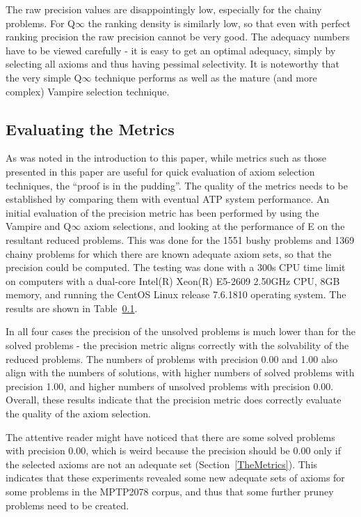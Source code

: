 \documentclass[EPiC]{easychair}
\begin{document}
The raw precision values are disappointingly low, especially for the
chainy problems.
For Q$\infty$ the ranking density is similarly low, so that even with perfect
ranking precision the raw precision cannot be very good.
The adequacy numbers have to be viewed carefully - it is easy to get an
optimal adequacy, simply by selecting all axioms and thus having pessimal
selectivity.
It is noteworthy that the very simple Q$\infty$ technique performs 
as well as the mature (and more complex) Vampire selection technique.

\subsection{Evaluating the Metrics}
\label{EvaluationOfMetrics}

As was noted in the introduction to this paper, while metrics such as
those presented in this paper are useful for quick evaluation of axiom
selection techniques, the ``proof is in the pudding''.
The quality of the metrics needs to be established by comparing them with 
eventual ATP system performance.
An initial evaluation of the precision metric has been performed by using
the Vampire and Q$\infty$ axiom selections, and looking at the performance 
of E on the resultant reduced problems.
This was done for the 1551 bushy problems and 1369 chainy problems for
which there are known adequate axiom sets, so that the precision could
be computed.
The testing was done with a 300s CPU time limit on 
computers with a dual-core Intel(R) Xeon(R) E5-2609 2.50GHz CPU,
8GB memory, and running the CentOS Linux release 7.6.1810 operating system.
The results are shown in Table~\ref{EvaluationOfMetrics}.

In all four cases the precision of the unsolved problems is much lower than for 
the solved problems - the precision metric aligns correctly with the solvability 
of the reduced problems.
The numbers of problems with precision 0.00 and 1.00 also align with the numbers
of solutions, with higher numbers of solved problems with precision 1.00, and
higher numbers of unsolved problems with precision 0.00.
Overall, these results indicate that the precision metric does correctly
evaluate the quality of the axiom selection.

The attentive reader might have noticed that there are some solved problems with
precision 0.00, which is weird because the precision should be 0.00 only if the 
selected axioms are not an adequate set (Section~\ref{TheMetrics}).
This indicates that these experiments revealed some new adequate sets of axioms
for some problems in the MPTP2078 corpus, and thus that some further pruney problems 
need to be created.
\end{document}
